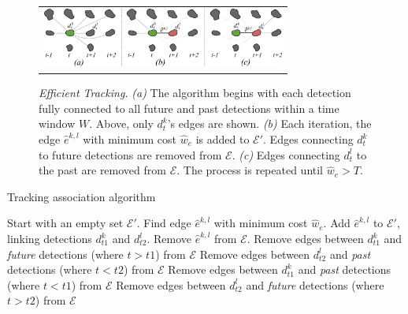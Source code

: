 \begin{figure}[t]
  \centering
       \begin{tabular}{c}
        \includegraphics[width = 80mm] {images/greedytracking.pdf}\\ [-2.4ex]
       \end{tabular} 
    \caption{  {\footnotesize {\it Efficient Tracking.}  {\em  (a)} The algorithm begins with each
        detection fully connected to all future and past detections
        within  a time  window  $W$.  Above, only  $d^k_t$'s edges  are
        shown. {\em  (b)} Each iteration,  the edge $\hat{e}^{k,l}$
        with   minimum  cost   $\hat{w}_e$  is  added  to $\mathcal{E}'$.   Edges  connecting
        $d^k_t$ to  future detections are  removed from $\mathcal{E}$.
        {\em  (c)} Edges  connecting  $d^l_t$ to  the past  are
        removed from $\mathcal{E}$.  The process is repeated until $\hat w_e > T$. }}
    \label{fig:greedytracking}
  
\vspace{-7mm}
\end{figure}


\begin{algorithm}[b]
\caption{Tracking association algorithm}
\footnotesize
\begin{algorithmic}[100]
\STATE Start with an empty set $\mathcal{E}'$.
\REPEAT
\STATE Find edge $\hat e^{k,l}$ with minimum cost $\hat w_e$.
\STATE Add $\hat e^{k,l}$ to $\mathcal{E}'$, linking detections $d^k_{t1}$ and $d^l_{t2}$.
\STATE Remove $\hat e^{k,l}$ from $\mathcal{E}$.
\STATE Remove edges between $d^k_{t1}$ and {\em future} detections (where $t > t1$) from $\mathcal{E}$
\STATE Remove edges between $d^l_{t2}$ and {\em past} detections (where $t < t2$) from $\mathcal{E}$
\ELSE
\STATE Remove edges between $d^k_{t1}$ and {\em past} detections (where $t < t1$) from $\mathcal{E}$
\STATE Remove edges between $d^l_{t2}$ and {\em future} detections (where $t > t2$) from $\mathcal{E}$
\ENDIF
{}
\end{algorithmic}
\normalsize
\label{algo:greedy}
\end{algorithm}


